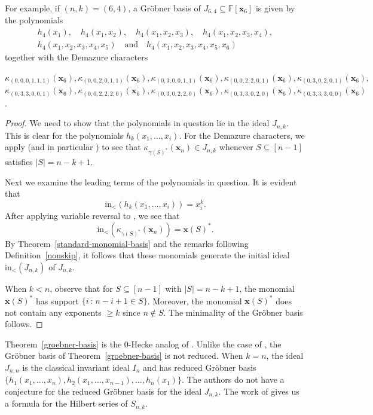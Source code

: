 \documentclass[ALCO,ThmDefs,published]{cedram}
\newcommand{\xx}{{\mathbf {x}}}
\newcommand{\FF}{{\mathbb{F}}}
\theoremstyle{plain}
\newcommand{\init}{{\mathrm {in}}}
\newcommand{\FF}{{\mathbb{F}}}
\newcommand{\xx}{{\mathbf {x}}}
\begin{document}
For example, if $(n,k) = (6,4)$, a Gr\"obner basis of $J_{6,4} \subseteq \FF[\xx_6]$ is given by the polynomials
\begin{gather*}
h_4(x_1),\quad h_4(x_1, x_2),\quad h_4(x_1, x_2, x_3),\quad h_4(x_1, x_2, x_3, x_4),\\
h_4(x_1, x_2, x_3, x_4, x_5)\quad\text{and}\quad h_4(x_1,x_2,x_3,x_4,x_5,x_6)
\end{gather*}
together with the Demazure characters
\begin{center}
$\kappa_{(0,0,0,1,1,1)}(\xx_6), \kappa_{(0,0,2,0,1,1)}(\xx_6), \kappa_{(0,3,0,0,1,1)}(\xx_6),
\kappa_{(0,0,2,2,0,1)}(\xx_6), \kappa_{(0,3,0,2,0,1)}(\xx_6),$ \\
$\kappa_{(0,3,3,0,0,1)}(\xx_6), \kappa_{(0,0,2,2,2,0)}(\xx_6), \kappa_{(0,3,0,2,2,0)}(\xx_6),
\kappa_{(0,3,3,0,2,0)}(\xx_6), \kappa_{(0,3,3,3,0,0)}(\xx_6)$.
\end{center}



\begin{proof}
We need to show that the polynomials in question lie in the ideal $J_{n,k}$.  This is clear for the polynomials
$h_k(x_1, \dots, x_i)$.  For the Demazure characters, we apply \cite[Lem. 3.4]{HRS} 
(and in particular \cite[Eqn. 3.4]{HRS}) to see that $\kappa_{\gamma(S)^*}(\xx_n) \in J_{n,k}$ whenever 
$S \subseteq [n-1]$ satisfies $|S| = n-k+1$.

Next we examine the leading terms of the polynomials in question.  It is evident that
\begin{equation*}
\init_<(h_k(x_1, \dots, x_i)) = x_i^k.  
\end{equation*}
After applying variable reversal to \cite[Lem. 3.5]{HRS}, we see that
\begin{equation*}
\init_<(\kappa_{\gamma(S)^*}(\xx_n)) = \xx(S)^*.
\end{equation*}
By Theorem~\ref{standard-monomial-basis} and the remarks following Definition~\ref{nonskip}, it follows
that these monomials generate the initial ideal $\init_<(J_{n,k})$ of $J_{n,k}$.

When $k < n$, observe that for $S \subseteq [n-1]$ with $|S| = n-k+1$, the monomial 
$\xx(S)^*$ has support $\{ i \,:\, n-i+1 \in S \}$.  Moreover, the monomial 
$\xx(S)^*$ does not contain any exponents $\geq k$ since $n \notin S$.  
The minimality of the Gr\"obner basis follows.
\end{proof}


Theorem~\ref{groebner-basis} is the 0-Hecke analog of \cite[Thm. 4.14]{HRS}.  
Unlike the case of \cite[Thm. 4.14]{HRS}, the Gr\"obner basis of Theorem~\ref{groebner-basis}
is not reduced.  
When $k = n$, the ideal $J_{n,n}$ is the classical invariant ideal $I_n$ and has 
reduced Gr\"obner basis $\{h_1(x_1, \dots, x_n), h_2(x_1, \dots, x_{n-1}), \dots, h_n(x_1) \}$.
The authors do not have a conjecture for the reduced Gr\"obner basis
for the ideal $J_{n,k}$.
The work of \cite{HRS} gives us a formula for the Hilbert series of $S_{n,k}$.
\end{document}
